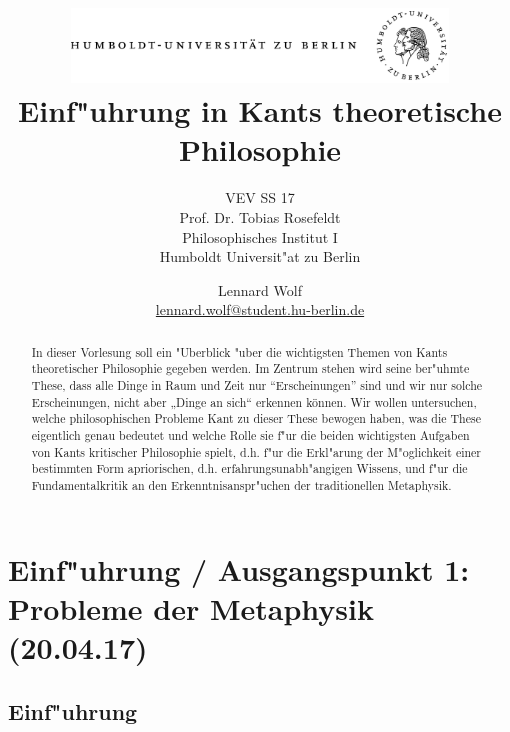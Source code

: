 \documentclass[emulatestandardclasses]{scrartcl}
\date{\vspace{-3ex}}
\begin{document}
\title{
	\includegraphics*[width=0.75\textwidth]{ErstesSem/images/hu_logo.png}\\
	\vspace{24pt}
	Einf"uhrung in Kants theoretische Philosophie}
\subtitle{VEV SS 17\\
          Prof. Dr. Tobias Rosefeldt\\
          Philosophisches Institut I \\ 
          Humboldt Universit"at zu Berlin}
\author{Lennard Wolf\\
        \small{\href{mailto:lennard.wolf@student.hu-berlin.de}{lennard.wolf@student.hu-berlin.de}}}
\maketitle
\begin{abstract}

In dieser Vorlesung soll ein "Uberblick "uber die wichtigsten Themen von Kants theoretischer Philosophie gegeben werden. Im Zentrum stehen wird seine ber"uhmte These, dass alle Dinge in Raum und Zeit nur "`Erscheinungen"' sind und wir nur solche Erscheinungen, nicht aber „Dinge an sich“ erkennen können. Wir wollen untersuchen, welche philosophischen Probleme Kant zu dieser These bewogen haben, was die These eigentlich genau bedeutet und welche Rolle sie f"ur die beiden wichtigsten Aufgaben von Kants kritischer Philosophie spielt, d.h. f"ur die Erkl"arung der M"oglichkeit einer bestimmten Form apriorischen, d.h. erfahrungsunabh"angigen Wissens, und f"ur die Fundamentalkritik an den Erkenntnisanspr"uchen der traditionellen Metaphysik.

\end{abstract}
\newpage

\tableofcontents
\listoffigures
\newpage


\section{Einf"uhrung / Ausgangspunkt 1: Probleme der Metaphysik\\(20.04.17)}

\subsection{Einf"uhrung}
\end{document}
